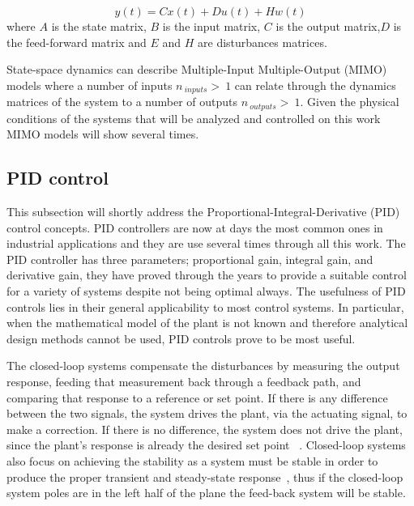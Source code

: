  \begin{equation}
y(t)=Cx(t)+Du(t)+Hw(t)
 \end{equation}
  where $A$ is the state matrix, $B$ is the input matrix, $C$ is the output matrix,$D$ is the feed-forward matrix and  $E$ and $H$ are disturbances matrices.
 \smallskip
 
State-space dynamics can describe Multiple-Input Multiple-Output (MIMO) models where a number of inputs $n_{~inputs}>~1$ can relate through the dynamics  matrices of the system to a number of outputs $n_{~outputs}>~1$. Given the physical conditions of the systems that will be analyzed and controlled on this work MIMO models will show several times.


\subsection{PID control}

This subsection will shortly address the Proportional-Integral-Derivative (PID) control  concepts. PID controllers are now at days the most common ones in industrial applications and they are use several times through all this work. The PID controller has three parameters; proportional gain, integral gain, and derivative gain, they have proved through the years to provide a suitable control for a variety of systems despite not being optimal always. The usefulness of PID controls lies in their general applicability to most control systems. In particular, when the mathematical model of the plant is not known and therefore analytical design methods cannot be used, PID controls prove to be most useful.  
\smallskip

The closed-loop systems compensate the disturbances by measuring the output
response, feeding that measurement back through a feedback path, and comparing
that response to a reference or set point. If there is any difference between
the two signals, the system drives the plant, via the actuating signal, to make a
correction. If there is no difference, the system does not drive the plant, since the
plant’s response is already the desired set point ~\cite[Chapter ~1]{Nise}. Closed-loop systems also focus on achieving the stability as a system must be stable in order to produce the proper transient and steady-state response~\cite[Chapter ~3]{Nise}, thus if the closed-loop system poles are in the left half of the plane the feed-back system will be stable.
\smallskip

